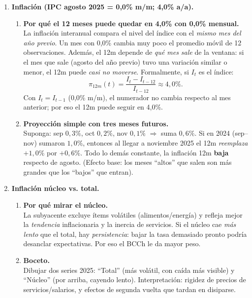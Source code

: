 \documentclass[11pt,addpoints]{article}
\begin{document}
\begin{enumerate}

\item \textbf{Inflación (IPC agosto 2025 = 0,0\% m/m; 4,0\% a/a).}
\begin{enumerate}[label=(\alph*)]
\item \textbf{Por qué el 12 meses puede quedar en 4,0\% con 0,0\% mensual.} \\
La inflación interanual compara el nivel del índice con el \emph{mismo mes del año previo}. Un mes con 0,0\% cambia muy poco el promedio móvil de 12 observaciones. Además, el 12m depende de \emph{qué mes sale} de la ventana: si el mes que sale (agosto del año previo) tuvo una variación similar o menor, el 12m puede \emph{casi no moverse}. Formalmente, si $I_t$ es el índice:
\[
\pi_{12m}(t)=\frac{I_t-I_{t-12}}{I_{t-12}}\approx 4{,}0\%.
\]
Con $I_t=I_{t-1}$ (0,0\% m/m), el numerador no cambia respecto al mes anterior; por eso el 12m puede seguir en 4,0\%.

\item \textbf{Proyección simple con tres meses futuros.} \\
Suponga: sep $0{,}3\%$, oct $0{,}2\%$, nov $0{,}1\%$ $\Rightarrow$ suma $0{,}6\%$. Si en 2024 (sep–nov) sumaron $1{,}0\%$, entonces al llegar a noviembre 2025 el 12m \emph{reemplaza} $+1{,}0\%$ por $+0{,}6\%$. Todo lo demás constante, la inflación 12m \textbf{baja} respecto de agosto. (Efecto base: los meses “altos” que salen son más grandes que los “bajos” que entran).
\end{enumerate}

\item \textbf{Inflación núcleo vs. total.}
\begin{enumerate}[label=(\alph*)]
\item \textbf{Por qué mirar el núcleo.} \\
La subyacente excluye ítems volátiles (alimentos/energía) y refleja mejor la \emph{tendencia} inflacionaria y la inercia de servicios. Si el núcleo cae \emph{más lento} que el total, hay \emph{persistencia}: bajar la tasa demasiado pronto podría desanclar expectativas. Por eso el BCCh le da mayor peso.
\item \textbf{Boceto.} \\
Dibujar dos series 2025: “Total” (más volátil, con caída más visible) y “Núcleo” (por arriba, cayendo lento). Interpretación: rigidez de precios de servicios/salarios, y efectos de segunda vuelta que tardan en disiparse.
\end{enumerate}


\end{enumerate}
\end{document}
